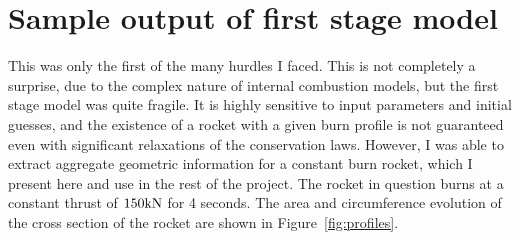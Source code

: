 \section{Sample output of first stage model}

This was only the first of the many hurdles I faced. This is not completely a surprise,
due to the complex nature of internal combustion
models, but the first stage model was quite fragile. It is highly sensitive to
input parameters and initial guesses, and the existence of a rocket with a given
burn profile is not
guaranteed even with significant relaxations of the conservation laws. However, I was
able to extract aggregate geometric information for a constant burn rocket, which I present
here and use in the rest of the project. The rocket in question burns at a constant thrust
of $150\rm{kN}$ for 4 seconds. The area and circumference evolution of the cross section of the rocket
are shown in Figure~\ref{fig:profiles}.

